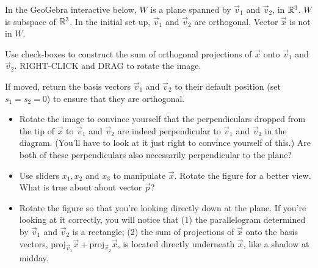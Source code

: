 \documentclass{ximera}
\begin{document}
\begin{exploration}\label{exp:orthProjSub}
In the GeoGebra interactive below, $W$ is a plane spanned by $\vec{v}_1$ and $\vec{v}_2$, in $\mathbb{R}^3$.  $W$ is subspace of $\mathbb{R}^3$.  In the initial set up, $\vec{v}_1$ and $\vec{v}_2$ are orthogonal.  Vector $\vec{x}$ is not in $W$.  

Use check-boxes to construct the sum of orthogonal projections of $\vec{x}$ onto $\vec{v}_1$ and $\vec{v}_2$.  RIGHT-CLICK and DRAG to rotate the image.   
\begin{center}
\end{center}

\begin{question}
If moved, return the basis vectors $\vec{v}_1$ and $\vec{v}_2$ to their default position (set $s_1=s_2=0$) to ensure that they are orthogonal.  

\begin{itemize}
\item Rotate the image to convince yourself that the perpendiculars dropped from the tip of $\vec{x}$ to $\vec{v}_1$ and $\vec{v}_2$ are indeed perpendicular to $\vec{v}_1$ and $\vec{v}_2$ in the diagram. (You'll have to look at it just right to convince yourself of this.)  Are both of these perpendiculars also necessarily perpendicular to the plane? 

\item Use sliders $x_1, x_2$ and $x_3$ to manipulate $\vec{x}$.  Rotate the figure for a better view.  What is true about about vector $\vec{p}$?
    
    \begin{multipleChoice}
 \end{multipleChoice}
 
  \item Rotate the figure so that you're looking directly down at the plane.  If you're looking at it correctly, you will notice that (1) the parallelogram determined by $\vec{v}_1$ and $\vec{v}_2$ is a rectangle; (2) the sum of projections of $\vec{x}$ onto the basis vectors, $\mbox{proj}_{\vec{v}_1}\vec{x}+\mbox{proj}_{\vec{v}_2}\vec{x}$, is located directly underneath $\vec{x}$, like a shadow at midday.
 \end{itemize} 
 \end{question}


\end{exploration}
\end{document}
